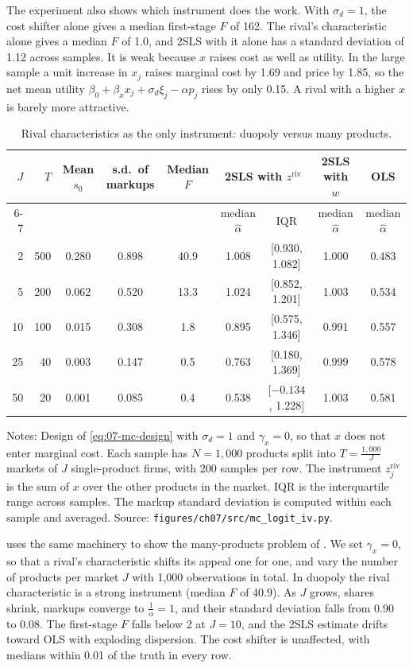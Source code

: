 The experiment also shows which instrument does the work. With $\sigma_d = 1$, the cost shifter alone gives a median
first-stage $F$ of 162. The rival's characteristic alone gives a median $F$ of 1.0, and 2SLS with it alone has a
standard deviation of 1.12 across samples. It is weak because $x$ raises cost as well as utility. In the large sample a
unit increase in $x_j$ raises marginal cost by 1.69 and price by 1.85, so the net mean utility $\beta_0 + \beta_x x_j +
\sigma_d\xi_j - \alpha p_j$ rises by only 0.15. A rival with a higher $x$ is barely more attractive.

\begin{table}[htbp]
\centering
\caption{Rival characteristics as the only instrument: duopoly versus many products.}
\label{tab:07-mc-weak}
\footnotesize
\setlength{\tabcolsep}{4.5pt}
\begin{tabular}{rrccccccc}
\toprule
$J$ & $T$ & Mean $s_0$ & s.d.\ of markups & Median $F$ & \multicolumn{2}{c}{2SLS with $z^{\mathrm{riv}}$} &
2SLS with $w$ & OLS \\
\cmidrule(lr){6-7}
 & & & & & median $\hat\alpha$ & IQR & median $\hat\alpha$ & median $\hat\alpha$ \\
\midrule
2 & 500 & 0.280 & 0.898 & 40.9 & 1.008 & [0.930, 1.082] & 1.000 & 0.483 \\
5 & 200 & 0.062 & 0.520 & 13.3 & 1.024 & [0.852, 1.201] & 1.003 & 0.534 \\
10 & 100 & 0.015 & 0.308 & 1.8 & 0.895 & [0.575, 1.346] & 0.991 & 0.557 \\
25 & 40 & 0.003 & 0.147 & 0.5 & 0.763 & [0.180, 1.369] & 0.999 & 0.578 \\
50 & 20 & 0.001 & 0.085 & 0.4 & 0.538 & [$-0.134$, 1.228] & 1.003 & 0.581 \\
\bottomrule
\end{tabular}
\par\smallskip
\parbox{\linewidth}{\footnotesize Notes: Design of \eqref{eq:07-mc-design} with $\sigma_d = 1$ and $\gamma_x = 0$, so
that $x$ does not enter marginal cost. Each sample has $N = 1{,}000$ products split into $T = \frac{1{,}000}{J}$
markets of $J$ single-product firms, with 200 samples per row. The instrument $z^{\mathrm{riv}}_{j}$ is the sum of $x$ over
the other products in the market. IQR is the interquartile range across samples. The markup standard deviation is computed within each sample and averaged. Source:
\texttt{figures/ch07/src/mc\_logit\_iv.py}.}
\end{table}

 uses the same machinery to show the many-products problem of \citet{Armstrong2016}. We set
$\gamma_x = 0$, so that a rival's characteristic shifts its appeal one for one, and vary the number of products per
market $J$ with 1,000 observations in total. In duopoly the rival characteristic is a strong instrument (median $F$ of
40.9). As $J$ grows, shares shrink, markups converge to $\frac{1}{\alpha} = 1$, and their standard deviation falls from
0.90 to 0.08. The first-stage $F$ falls below 2 at $J = 10$, and the 2SLS estimate drifts toward OLS with exploding
dispersion. The cost shifter is unaffected, with medians within 0.01 of the truth in every row.

